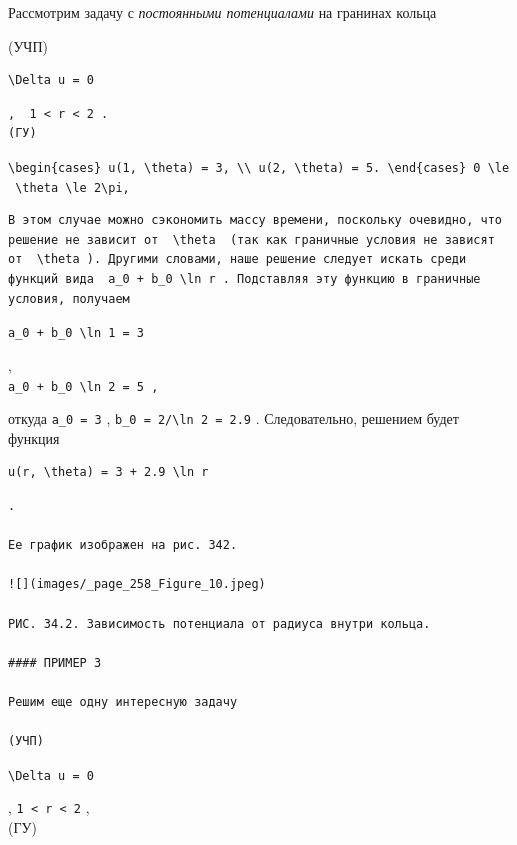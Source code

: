 \documentclass[
  ukrainian,
]{article}
\begin{document}
Рассмотрим задачу с \emph{постоянными потенциалами} на гранинах кольца

(УЧП)

\begin{verbatim}
\Delta u = 0
\end{verbatim}

\begin{verbatim}
,  1 < r < 2 .  
(ГУ)
\end{verbatim}

\texttt{\textbackslash{}begin\{cases\}\ u(1,\ \textbackslash{}theta)\ =\ 3,\ \textbackslash{}\textbackslash{}\ u(2,\ \textbackslash{}theta)\ =\ 5.\ \textbackslash{}end\{cases\}\ 0\ \textbackslash{}le\ \textbackslash{}theta\ \textbackslash{}le\ 2\textbackslash{}pi,}

\begin{verbatim}
В этом случае можно сэкономить массу времени, поскольку очевидно, что решение не зависит от  \theta  (так как граничные условия не зависят от  \theta ). Другими словами, наше решение следует искать среди функций вида  a_0 + b_0 \ln r . Подставляя эту функцию в граничные условия, получаем
\end{verbatim}

\texttt{a\_0\ +\ b\_0\ \textbackslash{}ln\ 1\ =\ 3}

,\\
\texttt{\textquotesingle{}a\_0\ +\ b\_0\ \textbackslash{}ln\ 2\ =\ 5\textquotesingle{}\ ,}

откуда \texttt{a\_0\ =\ 3} ,
\texttt{b\_0\ =\ 2/\textbackslash{}ln\ 2\ =\ 2.9} . Следовательно,
решением будет функция

\begin{verbatim}
u(r, \theta) = 3 + 2.9 \ln r
\end{verbatim}

\begin{verbatim}
.

Ее график изображен на рис. 342.

![](images/_page_258_Figure_10.jpeg)

РИС. 34.2. Зависимость потенциала от радиуса внутри кольца.

#### ПРИМЕР 3

Решим еще одну интересную задачу

(УЧП)
\end{verbatim}

\texttt{\textbackslash{}Delta\ u\ =\ 0}

, \texttt{1\ \textless{}\ r\ \textless{}\ 2} ,\\
(ГУ)
\end{document}

